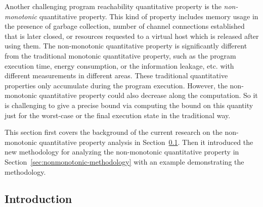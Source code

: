Another challenging program reachability quantitative property is the \emph{non-monotonic} quantitative property.
This kind of property includes memory usage in the presence of garbage collection,
number of channel connections established that is later closed,
or resources requested to a virtual host which is released after using them. 
The non-monotonic quantitative property is significantly different from the traditional monotonic quantitative property,
such as the program execution time, energy consumption,
or the information leakage, etc. with different measurements in different areas.
These traditional quantitative properties only accumulate during the program execution. 
However, the non-monotonic quantitative property could also decrease along the computation.
So it is challenging to give a precise bound via computing the bound on this quantity just for the worst-case or the final execution state in the traditional way.

This section first covers the background of the current research on the non-monotonic
quantitative property analysis in Section~\ref{sec:nonmonotonic-intro}.
Then it introduced the new methodology for analyzing the non-monotonic quantitative property in Section~\ref{sec:nonmonotonic-methodology} with an example demonstrating the methodology.
\subsection{Introduction }
\label{sec:nonmonotonic-intro}
